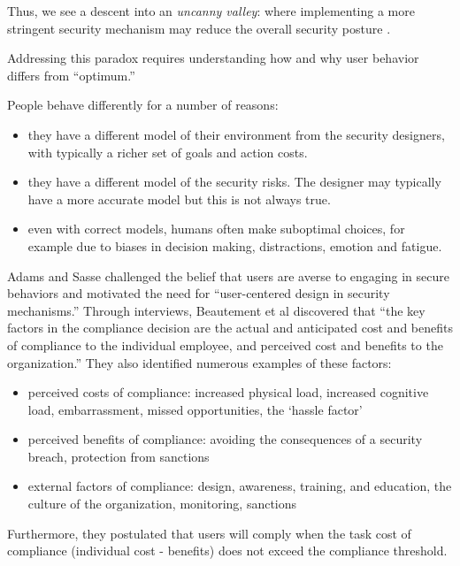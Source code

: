 \documentclass{acm_proc_article-sp}
\newcommand{\ignore}[1] {}
\begin{document}
Thus, we see a descent into an \textit{uncanny valley}: where
implementing a more stringent security mechanism may reduce the
overall security posture \cite{mori70}.
%
\ignore{Thus, what seems to be a simple monotonic relationship may in fact harbor
what graphics specialists call {\em uncanny valleys}: places where
dialing up the controls actually decreases overall security posture.}
%
Addressing this paradox requires understanding how and why user behavior
differs from ``optimum.''

People behave differently for a number of reasons: 
\begin{itemize}
\item they have a
different model of their environment from the security designers, with
typically a richer set of goals and action costs.
\item they have a
different model of the security risks. The designer may typically have
a more accurate model but this is not always true.
\item even with
correct models, humans often make suboptimal choices, for example due
to biases in decision making, distractions, emotion and fatigue.
\end{itemize}


Adams and Sasse 
\cite{adams1999users} challenged the belief that users 
are averse to engaging in secure behaviors and motivated the need for 
``user-centered design in security mechanisms.'' 
Through interviews, Beautement et al  \cite{beautement2009compliance} discovered that ``the key factors in 
the compliance decision are the actual and anticipated cost and benefits of 
compliance to the individual employee, and perceived cost and benefits to 
the organization.'' They also identified numerous examples of these factors:
\begin{itemize}
\item perceived costs of compliance: increased physical load, increased cognitive load, embarrassment, missed opportunities, the `hassle factor'
\item perceived benefits of compliance: avoiding the consequences of a security breach, protection from sanctions
\item external factors of compliance: design, awareness, training, and education, the culture of the organization, monitoring, sanctions
\end{itemize}
Furthermore, they postulated that users will comply when the task cost of 
compliance (individual cost - benefits) does not exceed the compliance threshold.
\end{document}
